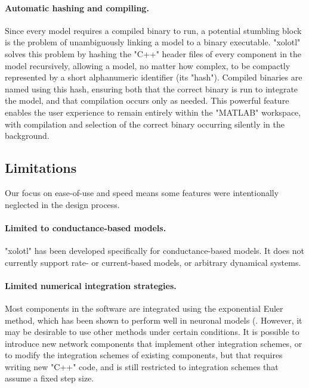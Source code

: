 \documentclass{frontiersSCNS} %
\begin{document}
\paragraph{Automatic hashing and compiling.}
Since every model requires a compiled binary to run, a potential stumbling block is the problem of unambiguously linking a model to a binary executable. "xolotl" solves this problem by hashing the "C++" header files of every component in the model recursively, allowing a model, no matter how complex, to be compactly represented by a short alphanumeric identifier (its "hash"). Compiled binaries are named using this hash, ensuring both that the correct binary is run to integrate the model, and that compilation occurs only as needed. This powerful feature enables the user experience to remain entirely within the "MATLAB" workspace, with compilation and selection of the correct binary occurring silently in the background.


\subsection{Limitations}
\label{limitations}

Our focus on ease-of-use and speed means some features were intentionally neglected in the design process.

\paragraph{Limited to conductance-based models.} "xolotl" has been developed specifically for conductance-based models. It does not currently support rate- or current-based models, or arbitrary dynamical systems.

\paragraph{Limited numerical integration strategies.} Most components in the software are integrated using the exponential Euler method, which has been shown to perform well in neuronal models (\cite{ohErrorAnalysisSpecialized2006, dayanTheoreticalNeuroscience2001}. However, it may be desirable to use other methods under certain conditions. It is possible to introduce new network components that implement other integration schemes, or to modify the integration schemes of existing components, but that requires writing new "C++"  code, and is still restricted to integration schemes that assume a fixed step size.
\end{document}
